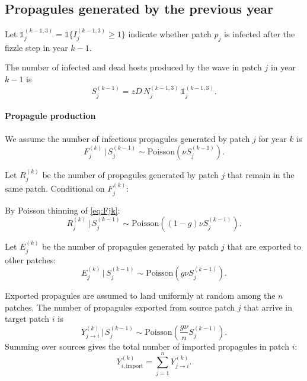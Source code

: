 \documentclass[12pt]{article}
\begin{document}
\subsection{Propagules generated by the previous year}
Let $\mathds{1}_j^{(k-1,3)}=\mathds{1}\{I_j^{(k-1,3)}\ge 1\}$ indicate whether patch $p_j$ is infected after the fizzle step in year $k-1$.

The number of infected and dead hosts produced by the wave in patch $j$ in year $k-1$ is 
\begin{equation}
S_j^{(k-1)} = zD\,N_j^{(k-1,3)}\,\mathds{1}_j^{(k-1,3)}.
\end{equation}

\paragraph{Propagule production}

We assume the number of infectious propagules generated by patch $j$ for year $k$ is 
\begin{equation}
F_j^{(k)} \,\big|\, S_j^{(k-1)} \sim \mathrm{Poisson}\!\left(\nu S_j^{(k-1)}\right).
\label{eq:Fjk}
\end{equation}

Let $R_j^{(k)}$ be the number of propagules generated by patch $j$ that remain in the same patch.
Conditional on $F_j^{(k)}$:

By Poisson thinning of \eqref{eq:Fjk}:
\begin{equation}
R_j^{(k)} \,\big|\, S_j^{(k-1)} \sim \mathrm{Poisson}\!\left((1-g)\nu S_j^{(k-1)}\right).
\label{eq:Rjk}
\end{equation}

Let $E_j^{(k)}$ be the number of propagules generated by patch $j$ that are exported to other patches:
\begin{equation}
E_j^{(k)} \,\big|\, S_j^{(k-1)} \sim \mathrm{Poisson}\!\left(g\nu S_j^{(k-1)}\right).
\label{eq:Ejk}
\end{equation}

Exported propagules are assumed to land uniformly at random among the $n$ patches.
The number of propagules exported from source patch $j$ that arrive in target patch $i$ is
\begin{equation}
Y_{j\to i}^{(k)} \,\big|\, S_j^{(k-1)} \sim \mathrm{Poisson}\!\left(\frac{g\nu}{n} S_j^{(k-1)}\right).
\label{eq:Yjtoi}
\end{equation}
Summing over sources gives the total number of imported propagules in patch $i$:
\begin{equation}
Y_{i,\mathrm{import}}^{(k)} = \sum_{j=1}^n Y_{j\to i}^{(k)}.
\label{eq:Yimport}
\end{equation}
\end{document}
